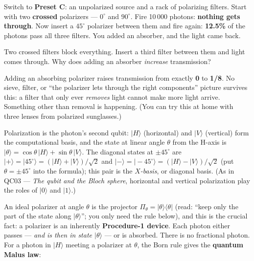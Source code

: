 \documentclass[a4paper,11pt]{article}
\providecommand{\ket}[1]{|#1\rangle}
\providecommand{\ketbra}[2]{|#1\rangle\langle#2|}
\begin{document}
\begin{benchbox}
Switch to \textbf{Preset C}: an unpolarized source and a rack of polarizing filters.
Start with two \textbf{crossed} polarizers --- $0^\circ$ and $90^\circ$. Fire
10\,000 photons: \textbf{nothing gets through}. Now insert a $45^\circ$ polarizer
between them and fire again: \textbf{12.5\%} of the photons pass all three filters.
You added an absorber, and the light came back.
\end{benchbox}

\begin{questionbox}
Two crossed filters block everything. Insert a third filter between them and light
comes through. Why does adding an absorber \emph{increase} transmission?
\end{questionbox}

\begin{shockbox}
Adding an absorbing polarizer raises transmission from exactly \textbf{0} to
\textbf{1/8}. No sieve, filter, or ``the polarizer lets through the right
components'' picture survives this: a filter that only ever \emph{removes} light
cannot make more light arrive. Something other than removal is happening. (You can
try this at home with three lenses from polarized sunglasses.)
\end{shockbox}

Polarization is the photon's second qubit: $\ket{H}$ (horizontal) and $\ket{V}$
(vertical) form the computational basis, and the state at linear angle $\theta$ from
the H-axis is $\ket{\theta} = \cos\theta\,\ket{H} + \sin\theta\,\ket{V}$. The
diagonal states at $\pm 45^\circ$ are
$\ket{+} = \ket{45^\circ} = (\ket{H} + \ket{V})/\sqrt 2$ and
$\ket{-} = \ket{-45^\circ} = (\ket{H} - \ket{V})/\sqrt 2$ (put $\theta = \pm 45^\circ$
into the formula); this pair is the \emph{$X$-basis}, or diagonal basis. (As in QC03
--- \textit{The qubit and the Bloch sphere}, horizontal and vertical polarization play
the roles of $\ket{0}$ and $\ket{1}$.)

An ideal polarizer at angle $\theta$ is the projector
$\Pi_\theta = \ketbra{\theta}{\theta}$ (read: ``keep only the part of the state along
$\ket{\theta}$''; you only need the rule below), and this is the crucial fact: a polarizer is
an inherently \textbf{Procedure-1 device}. Each photon either passes --- \emph{and is
then in state $\ket{\theta}$} --- or is absorbed. There is no fractional photon. For
a photon in $\ket{H}$ meeting a polarizer at $\theta$, the Born rule gives the
\textbf{quantum Malus law}:
\end{document}
